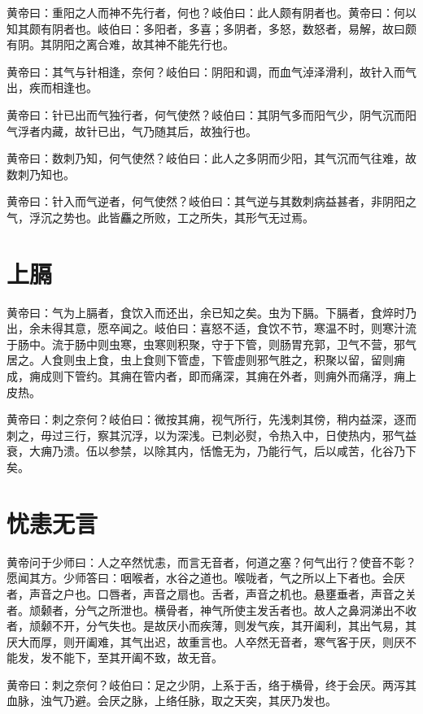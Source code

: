 \documentclass[12pt,UTF8]{ctexbook}
\begin{document}
	黄帝曰：重阳之人而神不先行者，何也？岐伯曰：此人颇有阴者也。黄帝曰：何以知其颇有阴者也。岐伯曰：多阳者，多喜；多阴者，多怒，数怒者，易解，故曰颇有阴。其阴阳之离合难，故其神不能先行也。
	
	黄帝曰：其气与针相逢，奈何？岐伯曰：阴阳和调，而血气淖泽滑利，故针入而气出，疾而相逢也。
	
	黄帝曰：针已出而气独行者，何气使然？岐伯曰：其阴气多而阳气少，阴气沉而阳气浮者内藏，故针已出，气乃随其后，故独行也。
	
	黄帝曰：数刺乃知，何气使然？岐伯曰：此人之多阴而少阳，其气沉而气往难，故数刺乃知也。
	
	黄帝曰：针入而气逆者，何气使然？岐伯曰：其气逆与其数刺病益甚者，非阴阳之气，浮沉之势也。此皆麤之所败，工之所失，其形气无过焉。
	
	\chapter{上膈}
		
	黄帝曰：气为上膈者，食饮入而还出，余已知之矣。虫为下膈。下膈者，食焠时乃出，余未得其意，愿卒闻之。岐伯曰：喜怒不适，食饮不节，寒温不时，则寒汁流于肠中。流于肠中则虫寒，虫寒则积聚，守于下管，则肠胃充郭，卫气不营，邪气居之。人食则虫上食，虫上食则下管虚，下管虚则邪气胜之，积聚以留，留则痈成，痈成则下管约。其痈在管内者，即而痛深，其痈在外者，则痈外而痛浮，痈上皮热。
	
	黄帝曰：刺之奈何？岐伯曰：微按其痈，视气所行，先浅刺其傍，稍内益深，逐而刺之，毋过三行，察其沉浮，以为深浅。已刺必熨，令热入中，日使热内，邪气益衰，大痈乃溃。伍以参禁，以除其内，恬憺无为，乃能行气，后以咸苦，化谷乃下矣。
	
	\chapter{忧恚无言}
	
	黄帝问于少师曰：人之卒然忧恚，而言无音者，何道之塞？何气出行？使音不彰？愿闻其方。少师答曰：咽喉者，水谷之道也。喉咙者，气之所以上下者也。会厌者，声音之户也。口唇者，声音之扇也。舌者，声音之机也。悬壅垂者，声音之关者。颃颡者，分气之所泄也。横骨者，神气所使主发舌者也。故人之鼻洞涕出不收者，颃颡不开，分气失也。是故厌小而疾薄，则发气疾，其开阖利，其出气易，其厌大而厚，则开阖难，其气出迟，故重言也。人卒然无音者，寒气客于厌，则厌不能发，发不能下，至其开阖不致，故无音。
	
	黄帝曰：刺之奈何？岐伯曰：足之少阴，上系于舌，络于横骨，终于会厌。两泻其血脉，浊气乃避。会厌之脉，上络任脉，取之天突，其厌乃发也。
	
\end{document}
